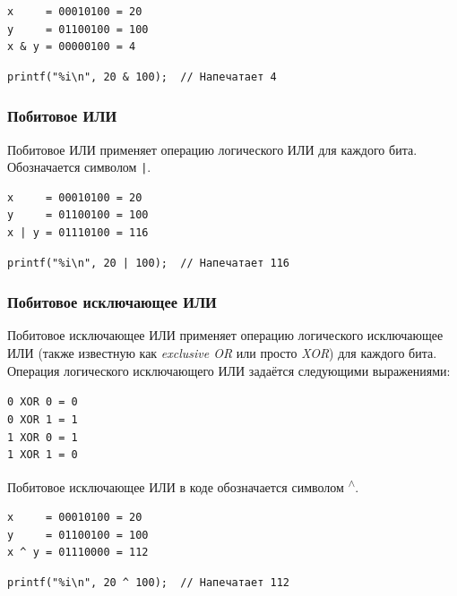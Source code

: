 \documentclass{article}
\begin{document}
\begin{minipage}{0.35\textwidth}
\begin{verbatim}
x     = 00010100 = 20
y     = 01100100 = 100
x & y = 00000100 = 4
\end{verbatim}
\end{minipage}
\hfill
\begin{minipage}{0.55\textwidth}
\begin{lstlisting}
printf("%i\n", 20 & 100);  // Напечатает 4
\end{lstlisting}
\end{minipage}

\subsubsection*{Побитовое ИЛИ}
Побитовое ИЛИ применяет операцию логического ИЛИ для каждого бита. Обозначается символом \texttt{|}.\\

\begin{minipage}{0.35\textwidth}
\begin{verbatim}
x     = 00010100 = 20
y     = 01100100 = 100
x | y = 01110100 = 116
\end{verbatim}
\end{minipage}
\hfill
\begin{minipage}{0.55\textwidth}
\begin{lstlisting}
printf("%i\n", 20 | 100);  // Напечатает 116
\end{lstlisting}
\end{minipage}
\subsubsection*{Побитовое исключающее ИЛИ}
Побитовое исключающее ИЛИ применяет операцию логического исключающее ИЛИ (также известную как \textit{exclusive OR} или просто \textit{XOR}) для каждого бита.  Операция логического исключающего ИЛИ задаётся следующими выражениями:
\begin{center}
\texttt{0 XOR 0 = 0}\\
\texttt{0 XOR 1 = 1}\\
\texttt{1 XOR 0 = 1}\\
\texttt{1 XOR 1 = 0}\\
\end{center}
Побитовое исключающее ИЛИ в коде обозначается символом \textsuperscript{$\wedge$}.\\

\begin{minipage}{0.35\textwidth}
\begin{verbatim}
x     = 00010100 = 20
y     = 01100100 = 100
x ^ y = 01110000 = 112
\end{verbatim}
\end{minipage}
\hfill
\begin{minipage}{0.55\textwidth}
\begin{lstlisting}
printf("%i\n", 20 ^ 100);  // Напечатает 112
\end{lstlisting}
\end{minipage}
\end{document}
